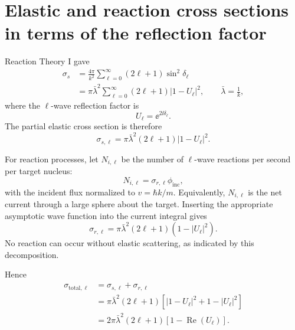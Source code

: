 
\section{Elastic and reaction cross sections in terms of the reflection factor}
Reaction Theory I gave
\begin{align*}
  \sigma_s
  &=\frac{4\pi}{k^2}\sum_{\ell=0}^{\infty}(2\ell+1)\sin^2\delta_\ell\\
  &=\pi\bar\lambda^2\sum_{\ell=0}^{\infty}(2\ell+1)|1-U_\ell|^2,
  \qquad \bar\lambda=\frac{1}{k},
  \tag{7}
\end{align*}
where the $\ell$-wave reflection factor is
\begin{equation*}
  U_\ell=\ee^{2\ii\delta_\ell}.
  \tag{8}
\end{equation*}
The partial elastic cross section is therefore
\begin{equation*}
  \sigma_{s,\ell}=\pi\bar\lambda^2(2\ell+1)|1-U_\ell|^2.
  \tag{9}
\end{equation*}

For reaction processes, let $N_{i,\ell}$ be the number of $\ell$-wave reactions per second per target nucleus:
\[
  N_{i,\ell}=\sigma_{r,\ell}\phi_{\mathrm{inc}},
\]
with the incident flux normalized to $v=\hbar k/m$.  Equivalently, $N_{i,\ell}$ is the net current through a large sphere about the target.  Inserting the appropriate asymptotic wave function into the current integral gives
\begin{equation*}
  \sigma_{r,\ell}=\pi\bar\lambda^2(2\ell+1)(1-|U_\ell|^2).
  \tag{11}
\end{equation*}
No reaction can occur without elastic scattering, as indicated by this decomposition.

Hence
\begin{align*}
  \sigma_{\mathrm{total},\ell}
  &=\sigma_{s,\ell}+\sigma_{r,\ell}\\
  &=\pi\bar\lambda^2(2\ell+1)
  \left[|1-U_\ell|^2+1-|U_\ell|^2\right]\\
  &=2\pi\bar\lambda^2(2\ell+1)
  \left[1-\operatorname{Re}(U_\ell)\right].
  \tag{12}
\end{align*}

